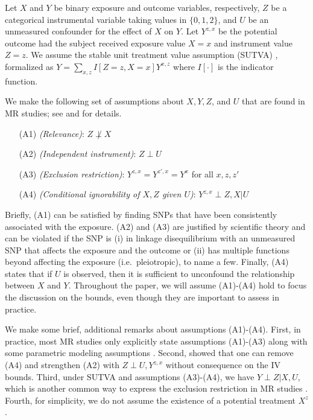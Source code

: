 \documentclass[AMA,STIX1COL,]{WileyNJD-v2}
\providecommand{\tightlist}{%
  \setlength{\itemsep}{0pt}\setlength{\parskip}{0pt}}
\begin{document}
\label{notation-and-definitions}

Let \(X\) and \(Y\) be binary exposure and outcome variables,
respectively, \(Z\) be a categorical instrumental variable taking values
in \(\{0, 1, 2\}\), and \(U\) be an unmeasured confounder for the effect
of \(X\) on \(Y\). Let \(Y^{z,x}\) be the potential outcome
\citep{rubin_estimating_1974, splawa-neyman_application_1990} had the
subject received exposure value \(X = x\) and instrument value
\(Z = z\). We assume the stable unit treatment value assumption (SUTVA)
\citep{cox_planning_1958, rubin_randomization_1980}, formalized as
\(Y = \sum_{x,z} I[Z = z, X = x] Y^{x,z}\) where \(I[\cdot]\) is the
indicator function.

We make the following set of assumptions about \(X, Y, Z\), and \(U\)
that are found in MR studies; see \citep{didelez_mendelian_2007} and
\citep{wang_bounded_2018} for details.

\begin{itemize}
\tightlist
\item[(A1)] \emph{(Relevance)}: $Z \not\perp X$ 
\item[(A2)] \emph{(Independent instrument)}: $Z \perp U$
\item[(A3)] \emph{(Exclusion restriction)}: $Y^{z,x} = Y^{z',x} = Y^{x}$ for all $x,z,z'$
\item[(A4)] \emph{(Conditional ignorability of $X,Z$ given $U$)}: $Y^{z,x} \perp Z, X | U$
\end{itemize}

Briefly, (A1) can be satisfied by finding SNPs that have been
consistently associated with the exposure. (A2) and (A3) are justified
by scientific theory and can be violated if the SNP is (i) in linkage
disequilibrium with an unmeasured SNP that affects the exposure and the
outcome or (ii) has multiple functions beyond affecting the exposure
(i.e.~pleiotropic), to name a few. Finally, (A4) states that if \(U\) is
observed, then it is sufficient to unconfound the relationship between
\(X\) and \(Y\). Throughout the paper, we will assume (A1)-(A4) hold to
focus the discussion on the bounds, even though they are important to
assess in practice.

We make some brief, additional remarks about assumptions (A1)-(A4).
First, in practice, most MR studies only explicitly state assumptions
(A1)-(A3) along with some parametric modeling assumptions
\citep{burgess_mendelian_2015}. Second, \citep{richardson_ace_2014}
showed that one can remove (A4) and strengthen (A2) with
\(Z \perp U, Y^{z,x}\) without consequence on the IV bounds. Third,
under SUTVA and assumptions (A3)-(A4), we have \(Y \perp Z | X, U\),
which is another common way to express the exclusion restriction in MR
studies \citep{didelez_mendelian_2007, swanson_partial_2018}. Fourth,
for simplicity, we do not assume the existence of a potential treatment
\(X^{z}\).
\end{document}
